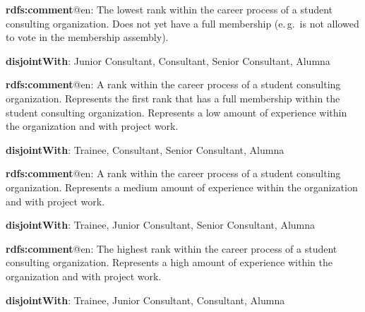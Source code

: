 \documentclass[a4paper, DIV=13, BCOR=0cm]{scrbook}
\newcommand{\eg}{e.\,g.\ }
\begin{document}
\begin{mdframed}[style=onto-3, frametitle={Trainee}]
	{%
		\begin{compactitem}
			\item \textbf{rdfs:comment}@en: The lowest rank within the career 
			process of a student consulting organization. Does not yet have a 
			full membership (\eg is not allowed to vote in the membership 
			assembly).
			\item \textbf{disjointWith}: Junior Consultant, Consultant, Senior 
			Consultant, Alumna
		\end{compactitem}
	} %
\end{mdframed}

\begin{mdframed}[style=onto-3, frametitle={Junior Consultant}]
	{%
		\begin{compactitem}
			\item \textbf{rdfs:comment}@en: A rank within the career process of 
			a student consulting organization. Represents the first rank that has a 
			full membership within the student consulting organization. 
			Represents a low amount of experience within the organization and 
			with project work.
			\item \textbf{disjointWith}: Trainee, Consultant, Senior Consultant, 
			Alumna
		\end{compactitem}
	} %
\end{mdframed}

\begin{mdframed}[style=onto-3, frametitle={Consultant}]
	{%
		\begin{compactitem}
			\item \textbf{rdfs:comment}@en: A rank within the career process of 
			a student consulting organization. Represents a medium amount of 
			experience within the organization and with project work.
			\item \textbf{disjointWith}: Trainee, Junior Consultant, Senior 
			Consultant, Alumna
		\end{compactitem}
	} %
\end{mdframed}

\begin{mdframed}[style=onto-3, frametitle={Senior Consultant}]
	{%
		\begin{compactitem}
			\item \textbf{rdfs:comment}@en: The highest rank within the career 
			process of a student consulting organization. Represents a high 
			amount of experience within the organization and with project work.
			\item \textbf{disjointWith}: Trainee, Junior Consultant, Consultant, 
			Alumna
		\end{compactitem}
	} %
\end{mdframed}
\end{document}
